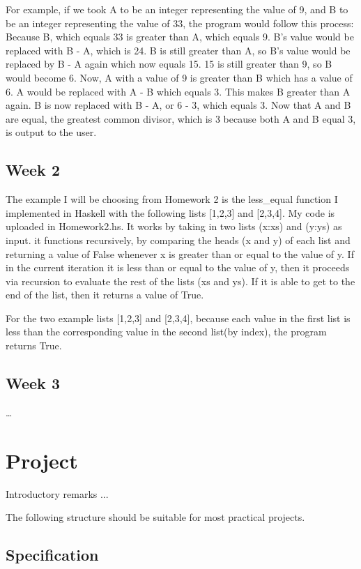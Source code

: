 \documentclass{article}
\theoremstyle{theorem}
\theoremstyle{definition}
\theoremstyle{remark}
\begin{document}
For example, if we took A to be an integer representing the value of 9, and B to be an integer representing the value of 33, the program would follow this process:
Because B, which equals 33 is greater than A, which equals 9. B's value would be replaced with B - A, which is 24. B is still greater than A, so B's value would be replaced by B - A again which now equals 15.
15 is still greater than 9, so B would become 6. Now, A with a value of 9 is greater than B which has a value of 6. A would be replaced with A - B which equals 3. This makes B greater than A again.
B is now replaced with B - A, or 6 - 3, which equals 3. Now that A and B are equal, the greatest common divisor, which is 3 because both A and B equal 3, is output to the user.

\subsection{Week 2}

The example I will be choosing from Homework 2 is the less\_equal function I implemented in Haskell with the following lists [1,2,3] and [2,3,4].
My code is uploaded in Homework2.hs. It works by taking in two lists (x:xs) and (y:ys) as input. it functions recursively, by comparing the heads (x and y) of each
list and returning a value of False whenever x is greater than or equal to the value of y. If in the current iteration it is less than or equal to the value of y, then it proceeds via recursion to evaluate the rest of the lists (xs and ys). If it is able to get to the end of the list, then it returns a value of True.

For the two example lists [1,2,3] and [2,3,4], because each value in the first list is less than the corresponding value in the second list(by index), the program returns True.

\subsection{Week 3}

\ldots

\section{Project}

Introductory remarks ...

The following structure should be suitable for most practical projects. 

\subsection{Specification}
\end{document}
